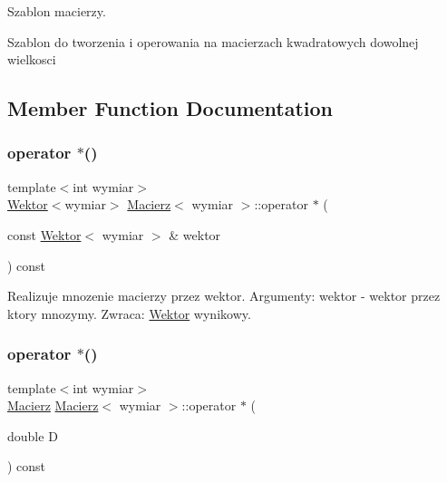 Szablon macierzy. 

Szablon do tworzenia i operowania na macierzach kwadratowych dowolnej wielkosci 

\subsection{Member Function Documentation}
\mbox{\label{class_macierz_a58be78b866f3a120b5c5bb654c8043b2}} 
\subsubsection{\texorpdfstring{operator $\ast$()}{operator *()}\hspace{0.1cm}{\footnotesize\ttfamily [1/3]}}
{\footnotesize\ttfamily template$<$int wymiar$>$ \\
\mbox{\hyperlink{class_wektor}{Wektor}}$<$wymiar$>$ \mbox{\hyperlink{class_macierz}{Macierz}}$<$ wymiar $>$\+::operator $\ast$ (\begin{DoxyParamCaption}\item[{const \mbox{\hyperlink{class_wektor}{Wektor}}$<$ wymiar $>$ \&}]{wektor }\end{DoxyParamCaption}) const\hspace{0.3cm}{\ttfamily [inline]}}

Realizuje mnozenie macierzy przez wektor. Argumenty\+: wektor -\/ wektor przez ktory mnozymy. Zwraca\+: \mbox{\hyperlink{class_wektor}{Wektor}} wynikowy. \mbox{\label{class_macierz_a68e53f895c6949465d318aef03b11803}} 
\subsubsection{\texorpdfstring{operator $\ast$()}{operator *()}\hspace{0.1cm}{\footnotesize\ttfamily [2/3]}}
{\footnotesize\ttfamily template$<$int wymiar$>$ \\
\mbox{\hyperlink{class_macierz}{Macierz}} \mbox{\hyperlink{class_macierz}{Macierz}}$<$ wymiar $>$\+::operator $\ast$ (\begin{DoxyParamCaption}\item[{double}]{D }\end{DoxyParamCaption}) const\hspace{0.3cm}{\ttfamily [inline]}}

